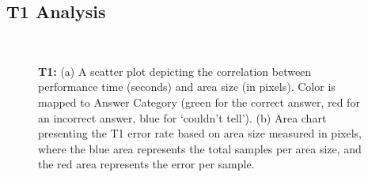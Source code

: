 \subsection{T1 Analysis}
\begin{figure}[p]
\centering
{} \\ \vspace{-0.35cm}
\caption{\textbf{T1:} (a) A scatter plot depicting the correlation between performance time (seconds) and area size (in pixels). Color is mapped to Answer Category (green for the correct answer, red for an incorrect answer, blue for `couldn't tell'). (b) Area chart presenting the T1 error rate based on area size measured in pixels, where the blue area represents the total samples per area size, and the red area represents the error per sample.} \label{fig:t1results}
\end{figure}
